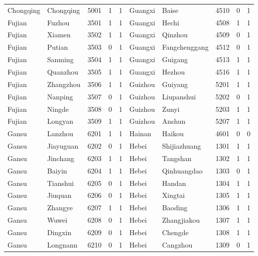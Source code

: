 \begin{table}[!htbp]
\begin{adjustbox}{width=\textwidth, totalheight=\baselineskip,keepaspectratio}
\begin{tabular}{llllllllll}
Chongqing & Chongqing & 5001 & 1   & 1   & Guangxi      & Baise         & 4510 & 0   & 1   \\
Fujian    & Fuzhou    & 3501 & 1   & 1   & Guangxi      & Hechi         & 4508 & 1   & 1   \\
Fujian    & Xiamen    & 3502 & 1   & 1   & Guangxi      & Qinzhou       & 4509 & 0   & 1   \\
Fujian    & Putian    & 3503 & 0   & 1   & Guangxi      & Fangchenggang & 4512 & 0   & 1   \\
Fujian    & Sanming   & 3504 & 1   & 1   & Guangxi      & Guigang       & 4513 & 1   & 1   \\
Fujian    & Quanzhou  & 3505 & 1   & 1   & Guangxi      & Hezhou        & 4516 & 1   & 1   \\
Fujian    & Zhangzhou & 3506 & 1   & 1   & Guizhou      & Guiyang       & 5201 & 1   & 1   \\
Fujian    & Nanping   & 3507 & 0   & 1   & Guizhou      & Liupanshui    & 5202 & 0   & 1   \\
Fujian    & Ningde    & 3508 & 0   & 1   & Guizhou      & Zunyi         & 5203 & 1   & 1   \\
Fujian    & Longyan   & 3509 & 1   & 1   & Guizhou      & Anshun        & 5207 & 1   & 1   \\
Gansu     & Lanzhou   & 6201 & 1   & 1   & Hainan       & Haikou        & 4601 & 0   & 0   \\
Gansu     & Jiayuguan & 6202 & 0   & 1   & Hebei        & Shijiazhuang  & 1301 & 1   & 1   \\
Gansu     & Jinchang  & 6203 & 1   & 1   & Hebei        & Tangshan      & 1302 & 1   & 1   \\
Gansu     & Baiyin    & 6204 & 1   & 1   & Hebei        & Qinhuangdao   & 1303 & 0   & 1   \\
Gansu     & Tianshui  & 6205 & 0   & 1   & Hebei        & Handan        & 1304 & 1   & 1   \\
Gansu     & Jiuquan   & 6206 & 0   & 1   & Hebei        & Xingtai       & 1305 & 1   & 1   \\
Gansu     & Zhangye   & 6207 & 1   & 1   & Hebei        & Baoding       & 1306 & 1   & 1   \\
Gansu     & Wuwei     & 6208 & 0   & 1   & Hebei        & Zhangjiakou   & 1307 & 1   & 1   \\
Gansu     & Dingxin   & 6209 & 0   & 1   & Hebei        & Chengde       & 1308 & 1   & 1   \\
Gansu     & Longnann  & 6210 & 0   & 1   & Hebei        & Cangzhou      & 1309 & 0   & 1   \\

\end{tabular}
\end{adjustbox}
\end{table}
